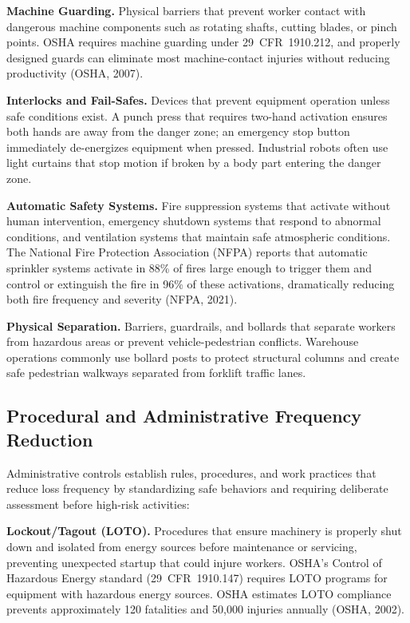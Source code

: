 \documentclass[11pt,openany]{book}
\begin{document}
\textbf{Machine Guarding.} Physical barriers that prevent worker contact with
dangerous machine components such as rotating shafts, cutting blades, or pinch
points. OSHA requires machine guarding under 29~CFR~1910.212, and properly
designed guards can eliminate most machine-contact injuries without reducing
productivity (OSHA, 2007).

\textbf{Interlocks and Fail-Safes.} Devices that prevent equipment operation
unless safe conditions exist. A punch press that requires two-hand activation
ensures both hands are away from the danger zone; an emergency stop button
immediately de-energizes equipment when pressed. Industrial robots often use
light curtains that stop motion if broken by a body part entering the danger
zone.

\textbf{Automatic Safety Systems.} Fire suppression systems that activate
without human intervention, emergency shutdown systems that respond to
abnormal conditions, and ventilation systems that maintain safe atmospheric
conditions. The National Fire Protection Association (NFPA) reports that
automatic sprinkler systems activate in 88\% of fires large enough to trigger
them and control or extinguish the fire in 96\% of these activations,
dramatically reducing both fire frequency and severity (NFPA, 2021).

\textbf{Physical Separation.} Barriers, guardrails, and bollards that separate
workers from hazardous areas or prevent vehicle-pedestrian conflicts.
Warehouse operations commonly use bollard posts to protect structural columns
and create safe pedestrian walkways separated from forklift traffic lanes.

\subsection{Procedural and Administrative Frequency Reduction}
\label{subsec:admin-frequency}

Administrative controls establish rules, procedures, and work practices that
reduce loss frequency by standardizing safe behaviors and requiring deliberate
assessment before high-risk activities:

\textbf{Lockout/Tagout (LOTO).} Procedures that ensure machinery is properly
shut down and isolated from energy sources before maintenance or servicing,
preventing unexpected startup that could injure workers. OSHA's Control of
Hazardous Energy standard (29~CFR~1910.147) requires LOTO programs for
equipment with hazardous energy sources. OSHA estimates LOTO compliance
prevents approximately 120 fatalities and 50{,}000 injuries annually (OSHA,
2002).
\end{document}
